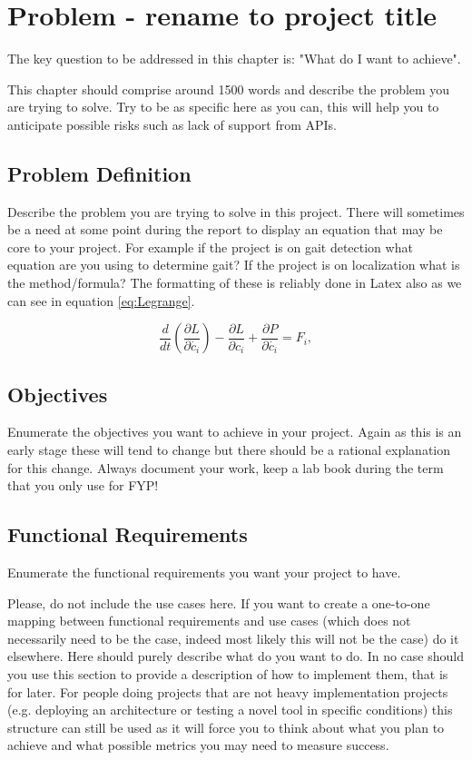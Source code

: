 \chapter{Problem - rename to project title}
\label{chap:problem}
The key question to be addressed in this chapter is: "What do I want to achieve".

This chapter should comprise around 1500 words and describe the problem you are trying to solve. Try to be as specific here as you can, this will help you to anticipate possible risks such as lack of support from APIs.

\section{Problem Definition}
Describe the problem you are trying to solve in this project. There will sometimes be a need at some point during the report to display an equation that may be core to your project. For example if the project is on gait detection what equation are you using to determine gait? If the project is on localization what is the method/formula? The formatting of these is reliably done in Latex also as we can see in equation \ref{eq:Legrange}.

\begin{equation}
\frac{d}{dt}(\frac{\partial L}{\partial \dot{c_i}})-\frac{\partial L}{\partial c_i}+\frac{\partial P}{\partial \dot{c_i}} = F_i,
\label{eq:Legrange}
\end{equation}


\section{Objectives}
Enumerate the objectives you want to achieve in your project. Again as this is an early stage these will tend to change but there should be a rational explanation for this change. Always document your work, keep a lab book during the term that you only use for FYP!

\section{Functional Requirements}
Enumerate the functional requirements you want your project to have. 

Please, do not include the use cases here. If you want to create a one-to-one mapping between functional requirements and use cases (which does not necessarily need to be the case, indeed most likely this will not be the case) do it elsewhere. Here should purely describe what do you want to do. In no case should you use this section to provide a description of how to implement them, that is for later. For people doing projects that are not heavy implementation projects (e.g. deploying an architecture or testing a novel tool in specific conditions) this structure can still be used as it will force you to think about what you plan to achieve and what possible metrics you may need to measure success.

